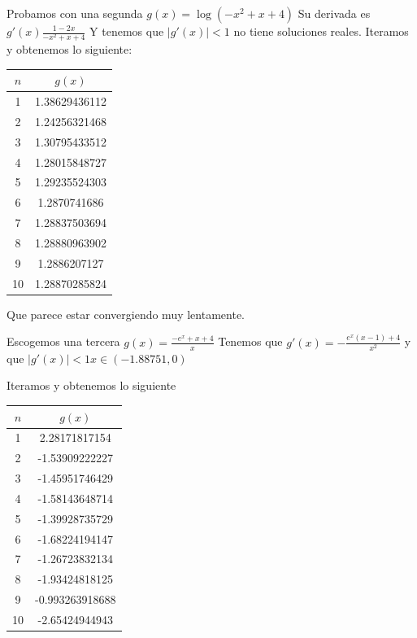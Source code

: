 \documentclass{article}
\begin{document}
Probamos con una segunda $g(x) = \log( -x^2 + x +4)$
Su derivada es $g'(x)\frac{1-2x}{-x^2+x+4}$
Y tenemos que $|g'(x)|<1$ no tiene soluciones reales.
Iteramos y obtenemos lo siguiente:

\begin{center}
    \begin{tabular}{||c c||} 
    \hline
    $n$ & $g(x)$\\ [0.5ex] 
    \hline
    1 & 1.38629436112 \\
    \hline
    2 & 1.24256321468 \\
    \hline
    3 & 1.30795433512 \\
    \hline
    4 & 1.28015848727 \\ 
    \hline
    5 & 1.29235524303 \\
    \hline
    6 & 1.2870741686 \\
    \hline
    7 & 1.28837503694 \\
    \hline
    8 & 1.28880963902\\
    \hline
    9 & 1.2886207127 \\ 
    \hline
    10 & 1.28870285824 \\ [1ex]
    \hline
   \end{tabular}
\end{center}

Que parece estar convergiendo muy lentamente.

Escogemos una tercera $g(x)= \frac{-e^x+x+4}{x}$
Tenemos que $g'(x) = - \frac{e^x(x-1)+4}{x^2}$
y que $|g'(x)|<1 x \in (-1.88751, 0)$

Iteramos y obtenemos lo siguiente

\begin{center}
    \begin{tabular}{||c c||} 
    \hline
    $n$ & $g(x)$\\ [0.5ex] 
    \hline
    1 & 2.28171817154  \\
    \hline
    2 & -1.53909222227 \\
    \hline
    3 & -1.45951746429 \\
    \hline
    4 & -1.58143648714 \\ 
    \hline
    5 & -1.39928735729 \\
    \hline
    6 & -1.68224194147 \\
    \hline
    7 & -1.26723832134 \\
    \hline
    8 & -1.93424818125\\
    \hline
    9 & -0.993263918688 \\ 
    \hline
    10 & -2.65424944943 \\ [1ex]
    \hline
   \end{tabular}
\end{center}
\end{document}
